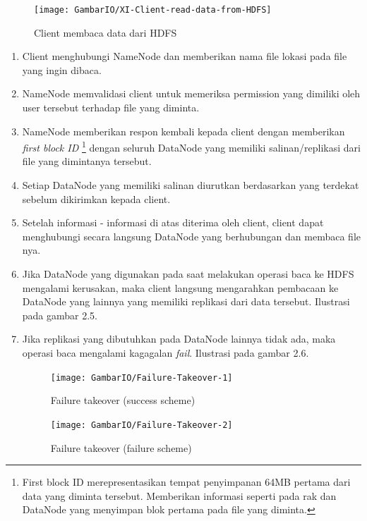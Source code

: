 			\begin{figure}[ht]
			\centering
			\texttt{[image: GambarIO/XI-Client-read-data-from-HDFS]}
			\caption[Client membaca data dari HDFS]{Client membaca data dari HDFS}
			\label{fig:XI-Client-read-data-from-HDFS}
			\end{figure}
			
			
			\begin{enumerate}
				\item Client menghubungi NameNode dan memberikan nama file lokasi pada file yang ingin dibaca.
				\item NameNode memvalidasi client untuk memeriksa permission yang dimiliki oleh user tersebut terhadap file yang diminta. 
				\item NameNode memberikan respon kembali kepada client dengan memberikan \textit{first block ID} \footnote{First block ID merepresentasikan tempat penyimpanan 64MB pertama dari data yang diminta tersebut. Memberikan informasi seperti pada rak dan DataNode yang menyimpan blok pertama pada file yang diminta.} dengan seluruh DataNode yang memiliki salinan/replikasi dari file yang dimintanya tersebut.
				\item Setiap DataNode yang memiliki salinan diurutkan berdasarkan yang terdekat sebelum dikirimkan kepada client.
				\item Setelah informasi - informasi di atas diterima oleh client, client dapat menghubungi secara langsung DataNode yang berhubungan dan membaca file nya.
				\item Jika DataNode yang digunakan pada saat melakukan operasi baca ke HDFS mengalami kerusakan, maka client langsung mengarahkan pembacaan ke DataNode yang lainnya yang memiliki replikasi dari data tersebut. Ilustrasi pada gambar 2.5.
				\item Jika replikasi yang dibutuhkan pada DataNode lainnya tidak ada, maka operasi baca mengalami kagagalan \textit{fail}. Ilustrasi pada gambar 2.6.
				
			\begin{figure}[h]
				\centering
				\texttt{[image: GambarIO/Failure-Takeover-1]}
				\caption[Failure takeover 1]{Failure takeover (success scheme)}
				\label{fig:Failure takeover (success scheme)}
			\end{figure}
			
			\begin{figure}[h]
				\centering
				\texttt{[image: GambarIO/Failure-Takeover-2]}
				\caption[Failure takeover 1]{Failure takeover (failure scheme)}
				\label{fig:Failure takeover (failure scheme)}
			\end{figure}
				
			\end{enumerate}		
